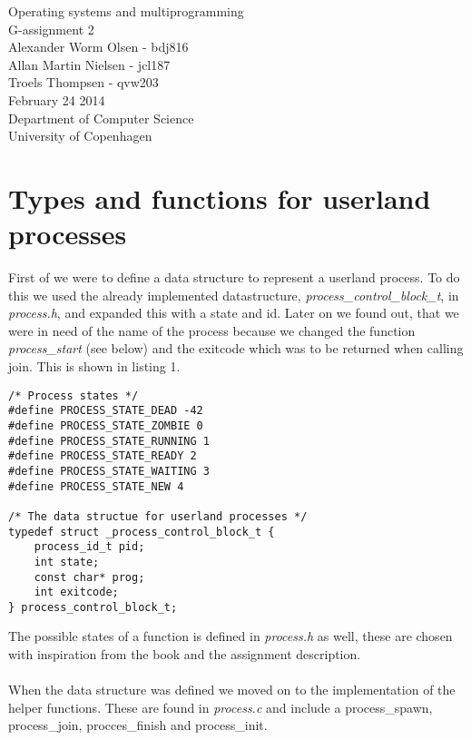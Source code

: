 \documentclass[12pt,a4paper,danish]{article}
\begin{document}
\lstset{language=C} 

\begin{titlepage}
    \vspace*{\fill}
    \begin{center}
      {\Huge Operating systems and multiprogramming}\\[0.7cm]
      {\huge G-assignment 2}\\[0.7cm]
      {\large Alexander Worm Olsen - bdj816}\\[0.4cm]
      {\large Allan Martin Nielsen - jcl187}\\[0.4cm]
      {\large Troels Thompsen - qvw203}\\[0.4cm]
      {\small February 24 2014}\\[0.3cm] 
      {\small Department of Computer Science}\\
      {\small University of Copenhagen}
    \end{center}
    \vspace*{\fill}
\end{titlepage}

\section{Types and functions for userland processes}
First of we were to define a data structure to represent a userland process. To do this we used the already implemented datastructure, \textit{process\_control\_block\_t}, in \textit{process.h}, and expanded this with a state and id. Later on we found out, that we were in need of the name of the process because we changed the function \textit{process\_start} (see below) and the exitcode which was to be returned when calling join. This is shown in listing 1.
\begin{lstlisting}[caption = Datastructe and states for a userland process.]
/* Process states */
#define PROCESS_STATE_DEAD -42
#define PROCESS_STATE_ZOMBIE 0
#define PROCESS_STATE_RUNNING 1
#define PROCESS_STATE_READY 2
#define PROCESS_STATE_WAITING 3
#define PROCESS_STATE_NEW 4

/* The data structue for userland processes */
typedef struct _process_control_block_t {
    process_id_t pid;
    int state;
    const char* prog;
    int exitcode;
} process_control_block_t;
\end{lstlisting}

The possible states of a function is defined in \textit{process.h} as well, these are chosen with inspiration from the book and the assignment description.\\\\
When the data structure was defined we moved on to the implementation of the helper functions. These are found in \textit{process.c} and include a process\_spawn, process\_join, procces\_finish and process\_init. 
\end{document}
